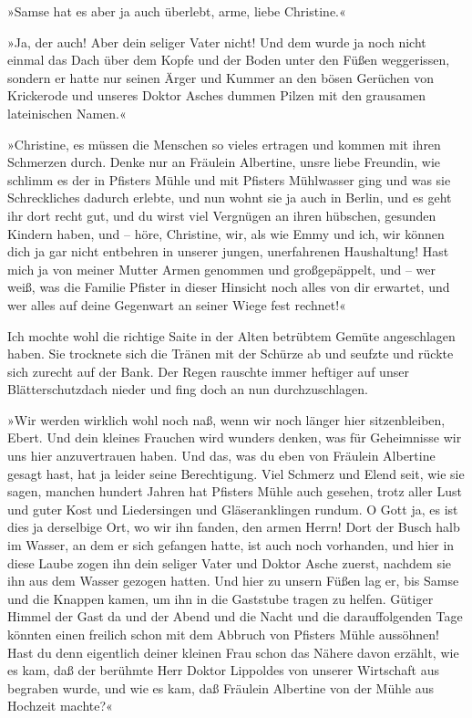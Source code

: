»Samse hat es aber ja auch überlebt, arme, liebe Christine.«

»Ja, der auch! Aber dein seliger Vater nicht! Und dem wurde ja noch
nicht einmal das Dach über dem Kopfe und der Boden unter den Füßen
weggerissen, sondern er hatte nur seinen Ärger und Kummer an den
bösen Gerüchen von Krickerode und unseres Doktor Asches dummen
Pilzen mit den grausamen lateinischen Namen.«

»Christine, es müssen die Menschen so vieles ertragen und kommen
mit ihren Schmerzen durch. Denke nur an Fräulein Albertine, unsre
liebe Freundin, wie schlimm es der in Pfisters Mühle und mit
Pfisters Mühlwasser ging und was sie Schreckliches dadurch erlebte,
und nun wohnt sie ja auch in Berlin, und es geht ihr dort recht
gut, und du wirst viel Vergnügen an ihren hübschen, gesunden
Kindern haben, und – höre, Christine, wir, als wie Emmy und ich,
wir können dich ja gar nicht entbehren in unserer jungen,
unerfahrenen Haushaltung! Hast mich ja von meiner Mutter Armen
genommen und großgepäppelt, und – wer weiß, was die Familie Pfister
in dieser Hinsicht noch alles von dir erwartet, und wer alles auf
deine Gegenwart an seiner Wiege fest rechnet!«

Ich mochte wohl die richtige Saite in der Alten betrübtem Gemüte
angeschlagen haben. Sie trocknete sich die Tränen mit der Schürze
ab und seufzte und rückte sich zurecht auf der Bank. Der Regen
rauschte immer heftiger auf unser Blätterschutzdach nieder und fing
doch an nun durchzuschlagen.

»Wir werden wirklich wohl noch naß, wenn wir noch länger hier
sitzenbleiben, Ebert. Und dein kleines Frauchen wird wunders
denken, was für Geheimnisse wir uns hier anzuvertrauen haben. Und
das, was du eben von Fräulein Albertine gesagt hast, hat ja leider
seine Berechtigung. Viel Schmerz und Elend seit, wie sie sagen,
manchen hundert Jahren hat Pfisters Mühle auch gesehen, trotz aller
Lust und guter Kost und Liedersingen und Gläseranklingen rundum. O
Gott ja, es ist dies ja derselbige Ort, wo wir ihn fanden, den
armen Herrn! Dort der Busch halb im Wasser, an dem er sich gefangen
hatte, ist auch noch vorhanden, und hier in diese Laube zogen ihn
dein seliger Vater und Doktor Asche zuerst, nachdem sie ihn aus dem
Wasser gezogen hatten. Und hier zu unsern Füßen lag er, bis Samse
und die Knappen kamen, um ihn in die Gaststube tragen zu helfen.
Gütiger Himmel der Gast da und der Abend und die Nacht und die
darauffolgenden Tage könnten einen freilich schon mit dem Abbruch
von Pfisters Mühle aussöhnen! Hast du denn eigentlich deiner
kleinen Frau schon das Nähere davon erzählt, wie es kam, daß der
berühmte Herr Doktor Lippoldes von unserer Wirtschaft aus begraben
wurde, und wie es kam, daß Fräulein Albertine von der Mühle aus
Hochzeit machte?«

